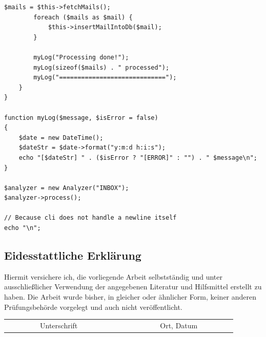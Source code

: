 \documentclass[a4paper,11pt,singlespacing]{article}
\begin{document}
\begin{lstlisting}[label={lst:PHP-Script},caption={PHP-SMTP-Persistance-Script}]
        $mails = $this->fetchMails();
        foreach ($mails as $mail) {
            $this->insertMailIntoDb($mail);
        }

        myLog("Processing done!");
        myLog(sizeof($mails) . " processed");
        myLog("=============================");
    }
}

function myLog($message, $isError = false)
{
    $date = new DateTime();
    $dateStr = $date->format("y:m:d h:i:s");
    echo "[$dateStr] " . ($isError ? "[ERROR]" : "") . " $message\n";
}

$analyzer = new Analyzer("INBOX");
$analyzer->process();

// Because cli does not handle a newline itself
echo "\n";
\end{lstlisting}

\newpage




\begin{newpage}
\vspace*{\fill}
\section*{Eidesstattliche Erklärung}\label{sec:Eidesstattliche Erklärung}
	Hiermit versichere ich, die vorliegende Arbeit selbstständig und unter ausschlie{\ss}licher Verwendung der angegebenen Literatur und Hilfsmittel erstellt zu haben. Die Arbeit wurde bisher, in gleicher oder ähnlicher Form, keiner anderen Prüfungsbehörde vorgelegt und auch nicht veröffentlicht.\\

\vspace{3cm}
\begin{tabular*}{\textwidth}{c@{\extracolsep\fill}cc}
\cline{1-1}
\cline{3-3}
\\
\ \ \ \ \ \ \ \ \ Unterschrift\ \ \ \ \ \ \ \ \ \ & & \ \ \ \ \ \ \ \ \ Ort, Datum\ \ \ \ \ \ \ \ \ \\
\end{tabular*}
\end{newpage}
\end{document}
